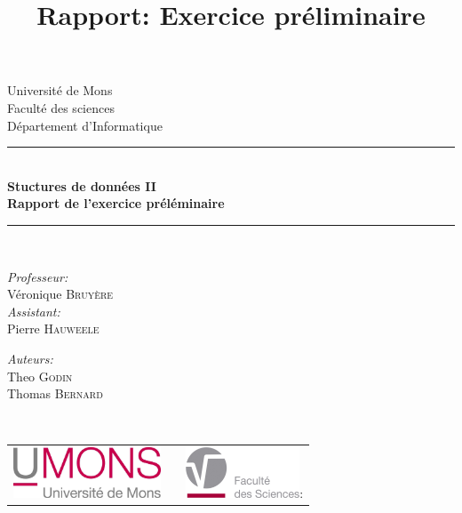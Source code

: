 \documentclass{article}
\title{Rapport: Exercice préliminaire}
\author{ }
\date{ }
\begin{document}
\begin{titlepage}
    \begin{center}
        
        {\Large Université de Mons}\\[1ex]
        {\Large Faculté des sciences}\\[1ex]
        {\Large Département d'Informatique}\\[2.5cm]
        
        \newcommand{\HRule}{\rule{\linewidth}{0.3mm}}
        \HRule \\[0.3cm]
        { \LARGE \bfseries Stuctures de données II \\[0.3cm]}
        { \LARGE \bfseries Rapport de l'exercice préléminaire \\[0.1cm]} %
        \HRule \\[1.5cm]
        
        \begin{minipage}[t]{0.45\textwidth}
            \begin{flushleft} \large
                \emph{Professeur:}\\
                Véronique \textsc{Bruyère}\\
                \emph{Assistant:}\\
                Pierre \textsc{Hauweele}\\
            \end{flushleft}
        \end{minipage}
        \begin{minipage}[t]{0.45\textwidth}
            \begin{flushright} \large
                \emph{Auteurs:} \\
                Theo \textsc{Godin} \\
                Thomas \textsc{Bernard} 
            \end{flushright}
        \end{minipage}\\[2ex]
        
        \vfill
        
        \begin{center}
            \begin{tabular}[t]{c c c}
                \includegraphics[height=1.5cm]{images/logoumons.jpg} &
                \hspace{0.3cm} &
                \includegraphics[height=1.5cm]{images/logofs.jpg}:
            \end{tabular}
        \end{center}~\\
        

\end{center}
\end{titlepage}
\end{document}
